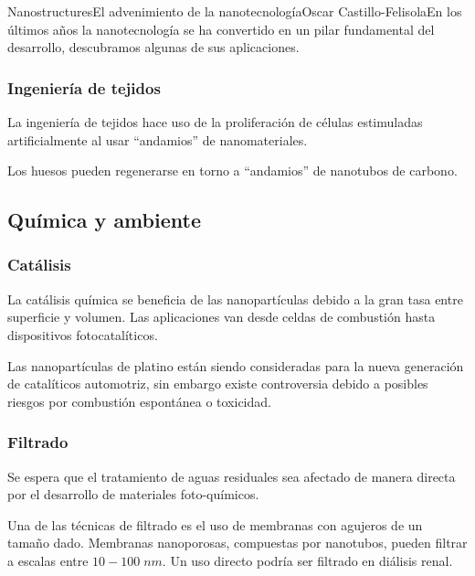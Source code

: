 \begin{article}{Nanostructures}{El advenimiento de la nanotecnolog\'ia}{Oscar Castillo-Felisola}{En los \'ultimos a\~nos la nanotecnolog\'ia se ha convertido en un pilar fundamental del desarrollo, descubramos algunas de sus aplicaciones.}
\subsubsection*{Ingenier\'ia de tejidos}

La ingenier\'ia de tejidos hace uso de la proliferaci\'on de c\'elulas estimuladas artificialmente al usar ``andamios'' de nanomateriales.

Los huesos pueden regenerarse en torno a ``andamios'' de nanotubos de carbono.



\subsection{Qu\'imica y ambiente}

\subsubsection*{Cat\'alisis}

La cat\'alisis qu\'imica se beneficia de las nanopart\'iculas debido a la gran tasa entre superficie y volumen. Las aplicaciones van desde celdas de combusti\'on hasta dispositivos fotocatal\'iticos.

Las nanopart\'iculas de platino est\'an siendo consideradas para la nueva generaci\'on de catal\'iticos automotriz, sin embargo existe controversia debido a posibles riesgos por combusti\'on espont\'anea o toxicidad.

\subsubsection*{Filtrado}

Se espera que el tratamiento de aguas residuales sea afectado de manera directa por el desarrollo de materiales foto-qu\'imicos.


Una de las t\'ecnicas de filtrado es el uso de membranas con agujeros de un tama\~no dado. Membranas nanoporosas, compuestas por nanotubos, pueden filtrar a escalas entre $10-100\;nm$. Un uso directo podr\'ia ser filtrado en di\'alisis renal.


\end{article}
